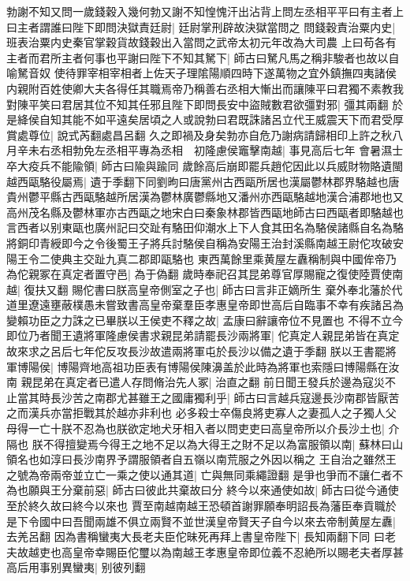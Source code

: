 勃謝不知又問一歲錢穀入幾何勃又謝不知惶愧汗出沾背上問左丞相平平曰有主者上曰主者謂誰曰陛下即問決獄責廷尉|{
	廷尉掌刑辟故決獄當問之}
問錢穀責治粟内史|{
	班表治粟内史秦官掌穀貨故錢穀出入當問之武帝太初元年改為大司農}
上曰苟各有主者而君所主者何事也平謝曰陛下不知其駑下|{
	師古曰駑凡馬之稱非駿者也故以自喻駑音奴}
使待罪宰相宰相者上佐天子理隂陽順四時下遂萬物之宜外鎮撫四夷諸侯内親附百姓使卿大夫各得任其職焉帝乃稱善右丞相大慚出而讓陳平曰君獨不素教我對陳平笑曰君居其位不知其任邪且陛下即問長安中盜賊數君欲彊對邪|{
	彊其兩翻}
於是絳侯自知其能不如平遠矣居頃之人或說勃曰君既誅諸呂立代王威震天下而君受厚賞處尊位|{
	說式芮翻處昌呂翻}
久之即禍及身矣勃亦自危乃謝病請歸相印上許之秋八月辛未右丞相勃免左丞相平專為丞相　初隆慮侯竈擊南越|{
	事見高后七年}
會暑濕士卒大疫兵不能隃領|{
	師古曰隃與踰同}
歲餘高后崩即罷兵趙佗因此以兵威財物賂遺閩越西甌駱役屬焉|{
	遺于季翻下同劉昫曰唐黨州古西甌所居也漢屬鬱林郡界駱越也唐貴州鬱平縣古西甌駱越所居漢為鬱林廣鬱縣地又潘州亦西甌駱越地漢合浦郡地也又高州茂名縣及鬱林軍亦古西甌之地宋白曰秦象林郡皆西甌地師古曰西甌者即駱越也言西者以别東甌也廣州記曰交趾有駱田仰潮水上下人食其田名為駱侯諸縣自名為駱將銅印青綬即今之令後蜀王子將兵討駱侯自稱為安陽王治封溪縣南越王尉佗攻破安陽王令二使典主交趾九真二郡即甌駱也}
東西萬餘里乘黄屋左纛稱制與中國侔帝乃為佗親冢在真定者置守邑|{
	為于偽翻}
歲時奉祀召其昆弟尊官厚賜寵之復使陸賈使南越|{
	復扶又翻}
賜佗書曰朕高皇帝側室之子也|{
	師古曰言非正嫡所生}
棄外奉北藩於代道里遼遠壅蔽樸愚未嘗致書高皇帝棄羣臣孝惠皇帝即世高后自臨事不幸有疾諸呂為變賴功臣之力誅之已畢朕以王侯吏不釋之故|{
	孟康曰辭讓帝位不見置也}
不得不立今即位乃者聞王遺將軍隆慮侯書求親昆弟請罷長沙兩將軍|{
	佗真定人親昆弟皆在真定故來求之呂后七年佗反攻長沙故遣兩將軍屯於長沙以備之遺于季翻}
朕以王書罷將軍博陽侯|{
	博陽齊地高祖功臣表有博陽侯陳濞盖於此時為將軍也索隱曰博陽縣在汝南}
親昆弟在真定者已遣人存問脩治先人冢|{
	治直之翻}
前日聞王發兵於邊為寇災不止當其時長沙苦之南郡尤甚雖王之國庸獨利乎|{
	師古曰言越兵寇邊長沙南郡皆厭苦之而漢兵亦當拒戰其於越亦非利也}
必多殺士卒傷良將吏寡人之妻孤人之子獨人父母得一亡十朕不忍為也朕欲定地犬牙相入者以問吏吏曰高皇帝所以介長沙土也|{
	介隔也}
朕不得擅變焉今得王之地不足以為大得王之財不足以為富服領以南|{
	蘇林曰山領名也如淳曰長沙南界予謂服領者自五嶺以南荒服之外因以稱之}
王自治之雖然王之號為帝兩帝並立亡一乘之使以通其道|{
	亡與無同乘繩證翻}
是爭也爭而不讓仁者不為也願與王分棄前惡|{
	師古曰彼此共棄故曰分}
終今以來通使如故|{
	師古曰從今通使至於終久故曰終今以來也}
賈至南越南越王恐頓首謝罪願奉明詔長為藩臣奉貢職於是下令國中曰吾聞兩雄不俱立兩賢不並世漢皇帝賢天子自今以來去帝制黄屋左纛|{
	去羌呂翻}
因為書稱蠻夷大長老夫臣佗昧死再拜上書皇帝陛下|{
	長知兩翻下同}
曰老夫故越吏也高皇帝幸賜臣佗璽以為南越王孝惠皇帝即位義不忍絶所以賜老夫者厚甚高后用事别異蠻夷|{
	别彼列翻}

